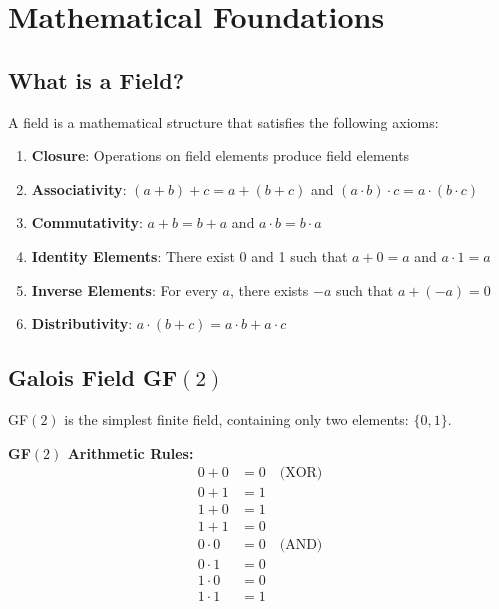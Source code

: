 \documentclass[11pt,a4paper]{article}
\begin{document}
\section{Mathematical Foundations}

\subsection{What is a Field?}

A field is a mathematical structure that satisfies the following axioms:

\begin{enumerate}
    \item \textbf{Closure}: Operations on field elements produce field elements
    \item \textbf{Associativity}: $(a + b) + c = a + (b + c)$ and $(a \cdot b) \cdot c = a \cdot (b \cdot c)$
    \item \textbf{Commutativity}: $a + b = b + a$ and $a \cdot b = b \cdot a$
    \item \textbf{Identity Elements}: There exist 0 and 1 such that $a + 0 = a$ and $a \cdot 1 = a$
    \item \textbf{Inverse Elements}: For every $a$, there exists $-a$ such that $a + (-a) = 0$
    \item \textbf{Distributivity}: $a \cdot (b + c) = a \cdot b + a \cdot c$
\end{enumerate}

\subsection{Galois Field GF$(2)$}

GF$(2)$ is the simplest finite field, containing only two elements: $\{0, 1\}$.

\begin{theorybox}
\textbf{GF$(2)$ Arithmetic Rules:}
\begin{align*}
0 + 0 &= 0 \quad \text{(XOR)} \\
0 + 1 &= 1 \\
1 + 0 &= 1 \\
1 + 1 &= 0 \\
0 \cdot 0 &= 0 \quad \text{(AND)} \\
0 \cdot 1 &= 0 \\
1 \cdot 0 &= 0 \\
1 \cdot 1 &= 1
\end{align*}
\end{theorybox}
\end{document}
